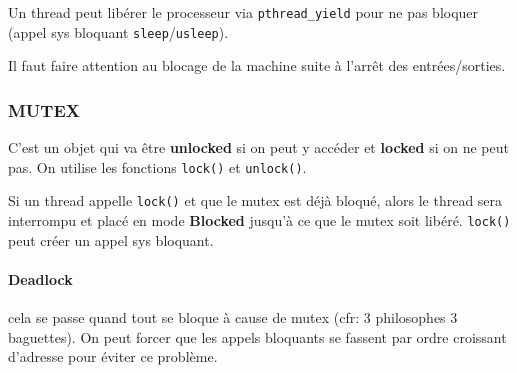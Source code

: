Un thread peut libérer le processeur via \texttt{pthread\_yield} pour ne
pas bloquer (appel sys bloquant \texttt{sleep}/\texttt{usleep}).

Il faut faire attention au blocage de la machine suite à l'arrêt des
entrées/sorties.

\subsubsection{MUTEX}\label{mutex}

C'est un objet qui va être \textbf{unlocked} si on peut y accéder et
\textbf{locked} si on ne peut pas. On utilise les fonctions
\texttt{lock()} et \texttt{unlock()}.

Si un thread appelle \texttt{lock()} et que le mutex est déjà bloqué,
alors le thread sera interrompu et placé en mode \textbf{Blocked}
jusqu'à ce que le mutex soit libéré. \texttt{lock()} peut créer un appel
sys bloquant.

\paragraph{Deadlock}\label{deadlock}

cela se passe quand tout se bloque à cause de mutex (cfr: 3 philosophes
3 baguettes). On peut forcer que les appels bloquants se fassent par
ordre croissant d'adresse pour éviter ce problème.

